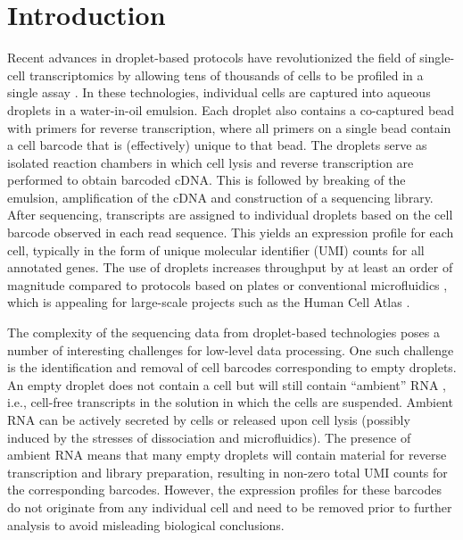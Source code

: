 \documentclass{bmcart}
\begin{document}
\section*{Introduction}
Recent advances in droplet-based protocols have revolutionized the field of single-cell transcriptomics by allowing tens of thousands of cells to be profiled in a single assay \cite{macosko2015highly,klein2015droplet,zheng2017massively}.
In these technologies, individual cells are captured into aqueous droplets in a water-in-oil emulsion.
Each droplet also contains a co-captured bead with primers for reverse transcription, where all primers on a single bead contain a cell barcode that is (effectively) unique to that bead.
The droplets serve as isolated reaction chambers in which cell lysis and reverse transcription are performed to obtain barcoded cDNA.
This is followed by breaking of the emulsion, amplification of the cDNA and construction of a sequencing library.
After sequencing, transcripts are assigned to individual droplets based on the cell barcode observed in each read sequence.
This yields an expression profile for each cell, typically in the form of unique molecular identifier (UMI) counts \cite{islam2014quantitative} for all annotated genes. 
The use of droplets increases throughput by at least an order of magnitude compared to protocols based on plates \cite{picelli2013smartseq2} or conventional microfluidics \cite{pollen2014low}, which is appealing for large-scale projects such as the Human Cell Atlas \cite{regev2017human}.

The complexity of the sequencing data from droplet-based technologies poses a number of interesting challenges for low-level data processing.
One such challenge is the identification and removal of cell barcodes corresponding to empty droplets.
An empty droplet does not contain a cell but will still contain ``ambient'' RNA \cite{macosko2015highly}, i.e., cell-free transcripts in the solution in which the cells are suspended.
Ambient RNA can be actively secreted by cells or released upon cell lysis (possibly induced by the stresses of dissociation and microfluidics).
The presence of ambient RNA means that many empty droplets will contain material for reverse transcription and library preparation, resulting in non-zero total UMI counts for the corresponding barcodes.
However, the expression profiles for these barcodes do not originate from any individual cell and need to be removed prior to further analysis to avoid misleading biological conclusions.
\end{document}
